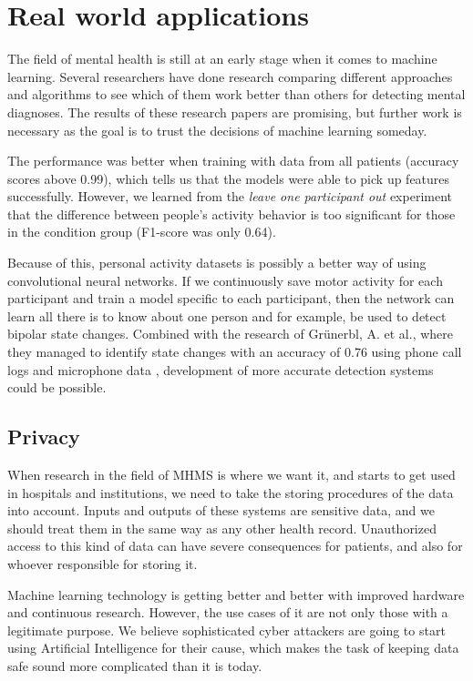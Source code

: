 \section{Real world applications}

The field of mental health is still at an early stage when it comes to machine learning. Several researchers have done research comparing different approaches and algorithms to see which of them work better than others for detecting mental diagnoses. The results of these research papers are promising, but further work is necessary as the goal is to trust the decisions of machine learning someday. 

The performance was better when training with data from all patients (accuracy scores above 0.99), which tells us that the models were able to pick up features successfully. However, we learned from the \textit{leave one participant out} experiment that the difference between people's activity behavior is too significant for those in the condition group (F1-score was only 0.64). 

Because of this, personal activity datasets is possibly a better way of using convolutional neural networks. If we continuously save motor activity for each participant and train a model specific to each participant, then the network can learn all there is to know about one person and for example, be used to detect bipolar state changes. Combined with the research of Grünerbl, A. et al., where they managed to identify state changes with an accuracy of 0.76 using phone call logs and microphone data \cite{grunerbl_smartphone_bipolar}, development of more accurate detection systems could be possible.

\subsection{Privacy}
When research in the field of MHMS is where we want it, and starts to get used in hospitals and institutions, we need to take the storing procedures of the data into account. Inputs and outputs of these systems are sensitive data, and we should treat them in the same way as any other health record. Unauthorized access to this kind of data can have severe consequences for patients, and also for whoever responsible for storing it. 

Machine learning technology is getting better and better with improved hardware and continuous research. However, the use cases of it are not only those with a legitimate purpose. We believe sophisticated cyber attackers are going to start using Artificial Intelligence for their cause, which makes the task of keeping data safe sound more complicated than it is today. 

